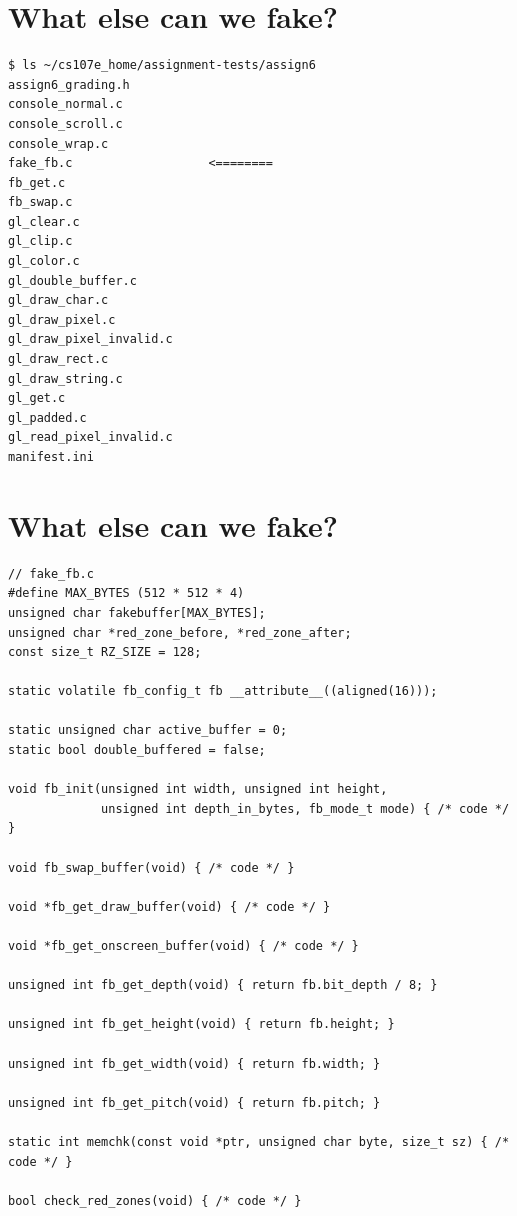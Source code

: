 \documentclass{article}
\begin{document}
\newpage

\section*{What else can we fake?}
\vspace{2ex}
\begin{verbatim}
$ ls ~/cs107e_home/assignment-tests/assign6
assign6_grading.h
console_normal.c
console_scroll.c
console_wrap.c
fake_fb.c                   <========
fb_get.c
fb_swap.c
gl_clear.c
gl_clip.c
gl_color.c
gl_double_buffer.c
gl_draw_char.c
gl_draw_pixel.c
gl_draw_pixel_invalid.c
gl_draw_rect.c
gl_draw_string.c
gl_get.c
gl_padded.c
gl_read_pixel_invalid.c
manifest.ini
\end{verbatim}

\section*{What else can we fake?}
\vspace{2ex}
\begin{verbatim}
// fake_fb.c
#define MAX_BYTES (512 * 512 * 4)
unsigned char fakebuffer[MAX_BYTES];
unsigned char *red_zone_before, *red_zone_after;
const size_t RZ_SIZE = 128;

static volatile fb_config_t fb __attribute__((aligned(16)));

static unsigned char active_buffer = 0;
static bool double_buffered = false;

void fb_init(unsigned int width, unsigned int height,
             unsigned int depth_in_bytes, fb_mode_t mode) { /* code */ }

void fb_swap_buffer(void) { /* code */ }

void *fb_get_draw_buffer(void) { /* code */ }

void *fb_get_onscreen_buffer(void) { /* code */ }

unsigned int fb_get_depth(void) { return fb.bit_depth / 8; }

unsigned int fb_get_height(void) { return fb.height; }

unsigned int fb_get_width(void) { return fb.width; }

unsigned int fb_get_pitch(void) { return fb.pitch; }

static int memchk(const void *ptr, unsigned char byte, size_t sz) { /* code */ }

bool check_red_zones(void) { /* code */ }
\end{verbatim}
\end{document}
